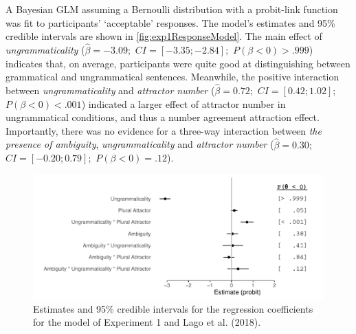 \documentclass[doc,a4paper,man,natbib,floatsintext,noextraspace]{apa6}\usepackage[]{graphicx}\usepackage[]{color}
\makeatletter
\def\maxwidth{ %
  \ifdim\Gin@nat@width>\linewidth
    \linewidth
  \else
    \Gin@nat@width
  \fi
}
\newenvironment{knitrout}{}{} %
\makeatother
\begin{document}
A Bayesian GLM assuming a Bernoulli distribution with a probit-link function was fit to participants' `acceptable' responses. The model's estimates and 95\% credible intervals are shown in \autoref{fig:exp1ResponseModel}. 
%
%
The main effect of \textit{ungrammaticality} ($\hat{\beta}=-3.09;$ $CI=[-3.35; -2.84];$ $P(\beta<0)> .999$) indicates that, on average, participants were quite good at distinguishing between grammatical and ungrammatical sentences. Meanwhile, the positive interaction between \textit{ungrammaticality} and \textit{attractor number} ($\hat{\beta}=0.72;$ $CI=[0.42; 1.02];$ $P(\beta<0)< .001$) indicated a larger effect of attractor number in ungrammatical conditions, and thus a number agreement attraction effect.
Importantly, there was no evidence for a three-way interaction between \textit{the presence of ambiguity}, \textit{ungrammaticality} and \textit{attractor number} ($\hat{\beta}=0.30;$ $CI=[-0.20; 0.79];$ $P(\beta<0)=    .12$).




\begin{knitrout}
\color{fgcolor}\begin{figure}

{\centering \includegraphics[width=\maxwidth]{figure/exp1ResponseModel-1} 

}

\caption[Estimates and 95\% credible intervals for the regression coefficients for the model of Experiment 1 and Lago et al]{Estimates and 95\% credible intervals for the regression coefficients for the model of Experiment 1 and Lago et al. (2018).}\label{fig:exp1ResponseModel}
\end{figure}


\end{knitrout}
\end{document}
